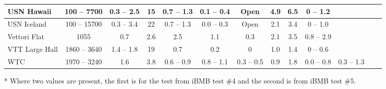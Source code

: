 \begin{sidewaystable}[p]
\begin{center}
\begin{tabular}{|l|c|c|c|c|c|c|c|c|c|c|c|c|}
USN Hawaii                     & 100 -- 7700      & 0.3 -- 2.5    & 15      & 0.7 -- 1.3              & 0.1 -- 0.4                  & Open          & 4.9                  & 6.5                & 0 -- 1.2                    &                                          \\ \hline
USN Iceland                    & 100 -- 15700   & 0.3 -- 3.4    & 22      & 0.7 -- 1.3             & 0.0 -- 0.3                  & Open           & 2.1                 & 3.4                & 0 -- 1.0                     &                                       \\ \hline
Vettori Flat                      & 1055                & 0.7             & 2.6     & 2.5                      & 1.1                            & 0.3               & 2.1                 & 3.5                & 0.8 -- 2.9                  &                                       \\ \hline
VTT Large Hall                 & 1860 -- 3640   & 1.4 -- 1.8    & 19     & 0.7                      & 0.2                             & 0                  & 1.0                 & 1.4                & 0 -- 0.6                      &                                    \\ \hline
WTC                               & 1970 -- 3240   & 1.6              & 3.8    & 0.6 -- 0.9             & 0.8 -- 1.1                  & 0.3 -- 0.5     & 0.9                  & 1.8               & 0.0 -- 0.8                   & 0.3 -- 1.3                    \\ \hline
\end{tabular}
\end{center}
* Where two values are present, the first is for the test from iBMB test \#4 and the second is from iBMB test \#5.
\label{Test_Parameters}
\nopagebreak
\end{sidewaystable}




\noindent
